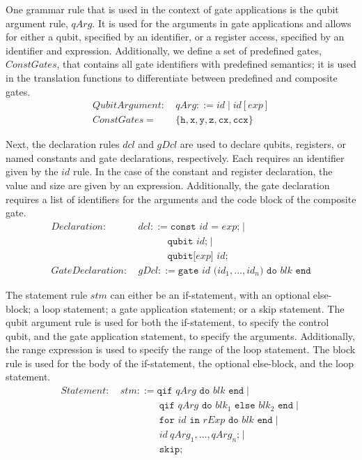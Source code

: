 One grammar rule that is used in the context of gate applications is the qubit argument rule, $qArg$. It is used for the arguments in gate applications and allows for either a qubit, specified by an identifier, or a register access, specified by an identifier and expression. Additionally, we define a set of predefined gates, $ConstGates$, that contains all gate identifiers with predefined semantics; it is used in the translation functions to differentiate between predefined and composite gates.
\begin{align*}
    QubitArgument: \ & qArg ::= id \mid id[exp]\\
    ConstGates =& \{\texttt{h}, \texttt{x}, \texttt{y}, \texttt{z}, \texttt{cx}, \texttt{ccx}\}
\end{align*}

Next, the declaration rules $dcl$ and $gDcl$ are used to declare qubits, registers, or named constants and gate declarations, respectively. Each requires an identifier given by the $id$ rule. In the case of the constant and register declaration, the value and size are given by an expression. Additionally, the gate declaration requires a list of identifiers for the arguments and the code block of the composite gate.
\begin{align*}
    Declaration: \ & dcl ::= \texttt{const } id \texttt{ = } exp \texttt{;} \mid \\
                 & \quad \quad \quad \texttt{qubit } id \texttt{;} \mid \\
                 & \quad \quad \quad \texttt{qubit[} exp \texttt{] } id \texttt{;}\\
    GateDeclaration: \ & gDcl::= \texttt{gate } id \texttt{ (}id_1, \dots, id_n\texttt{) do } blk \texttt{ end}
\end{align*}

The statement rule $stm$ can either be an if-statement, with an optional else-block; a loop statement; a gate application statement; or a skip statement. The qubit argument rule is used for both the if-statement, to specify the control qubit, and the gate application statement, to specify the arguments. Additionally, the range expression is used to specify the range of the loop statement. The block rule is used for the body of the if-statement, the optional else-block, and the loop statement.
\begin{align*}
    Statement: \ & stm ::= \texttt{qif } qArg \texttt{ do }  blk \texttt{ end} \mid\\
                 & \quad \quad \quad \quad \texttt{qif } qArg \texttt{ do }  blk_1 \texttt{ else } blk_2 \texttt{ end} \mid\\
                 & \quad \quad \quad \quad \texttt{for } id \texttt{ in } rExp \texttt{ do } blk \texttt{ end} \mid \\
                 & \quad \quad \quad \quad id \ qArg_1, \dots, qArg_n \texttt{;} \mid \\
                 & \quad \quad \quad \quad \texttt{skip;}
\end{align*}

